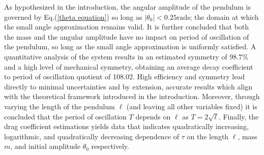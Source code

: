 As hypothesized in the introduction, the angular amplitude of the pendulum is 
governed by Eq.(\ref{theta equation}) so long as $|\theta_0| < 0.25\text{rads}$; 
the domain at which the small angle approximation remains valid. It is further 
concluded that both the mass and the angular amplitude have no impact on period 
of oscillation of the pendulum, so long as the small angle approximation is 
uniformly satisfied. A quantitative analysis of the system results in an 
estimated symmetry of $98.7\%$ and a high level of mechanical symmetry, 
obtaining an average decay coefficient to period of oscillation quotient of 
108.02. High efficiency and symmetry lead directly to minimal uncertainties and 
by extension, accurate results which align with the theoretical framework 
introduced in the introduction. Moreover, through varying the length of the 
pendulum $\ell$ (and leaving all other variables fixed) it is concluded that 
the period of oscillation $T$ depends on $\ell$ as $T = 2\sqrt{\ell}$. Finally, 
the drag coefficient estimations yields data that indicates quadratically 
increasing, logarithmic, and quadratically decreasing dependence of $\tau$ on 
the length $\ell$, mass $m$, and initial amplitude $\theta_0$ respectively.
